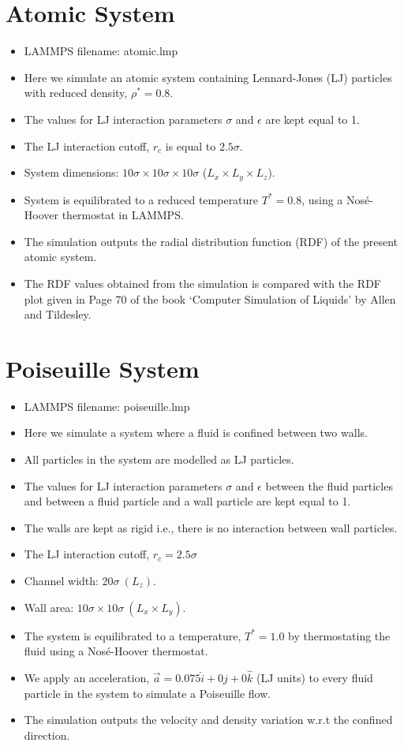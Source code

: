 \documentclass[12pt]{article}
\begin{document}
\newpage
\section{Atomic System}
\begin{itemize}
\item LAMMPS filename: atomic.lmp
\item Here we simulate an atomic system containing Lennard-Jones (LJ) particles with 
reduced density, $\rho^{*} = 0.8$.
\item The values for LJ interaction parameters $\sigma$ and $\epsilon$ are kept equal to 1.
\item The LJ interaction cutoff, $r_c$ is equal to $2.5\sigma$.
\item System dimensions: $10\sigma \times 10\sigma \times 10\sigma$ 
($L_{x} \times L_{y} \times L_{z}$).
\item System is equilibrated to a reduced temperature $T^{*} = 0.8$, 
using a Nos\'e-Hoover thermostat in LAMMPS.
\item The simulation outputs the radial distribution function (RDF) of the 
present atomic system.
\item The RDF values obtained from the simulation is compared with the RDF plot given 
in Page 70 of the book `Computer Simulation of Liquids' by Allen and Tildesley. 
\end{itemize}

\section{Poiseuille System}
\begin{itemize}
\item LAMMPS filename: poiseuille.lmp
\item Here we simulate a system where a fluid is confined between two walls.
\item All particles in the system are modelled as LJ particles.
\item The values for LJ interaction parameters $\sigma$ and $\epsilon$ between the fluid particles 
and between a fluid particle and a wall particle are kept equal to 1.
\item The walls are kept as rigid i.e., there is no interaction between wall particles.
\item The LJ interaction cutoff, $r_c = 2.5\sigma$
\item Channel width: $20\sigma \ (L_{z})$.
\item Wall area: $10\sigma \times 10\sigma \ (L_x \times L_y)$.
\item The system is equilibrated to a temperature, $T^* = 1.0$ by thermostating the fluid using a
Nos\'e-Hoover thermostat.
\item We apply an acceleration, $\vec{a} = 0.075\hat{i} + 0 \hat{j} + 0\hat{k}$ (LJ units) to 
every fluid particle in the system to simulate a Poiseuille flow.
\item The simulation outputs the velocity and density variation w.r.t the confined direction.
\end{itemize}
\end{document}
